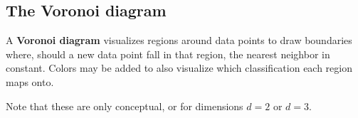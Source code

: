 \documentclass[titlepage, 12pt, leqno]{article}
\begin{document}
\subsection{The Voronoi diagram}
\begin{definition}
    A \textbf{Voronoi diagram} visualizes regions around data points to draw
    boundaries where, should a new data point fall in that region, the nearest
    neighbor in constant. Colors may be added to also visualize which 
    classification each region maps onto.

    Note that these are only conceptual, or for dimensions $d=2$ or $d=3$.
\end{definition}
\end{document}
